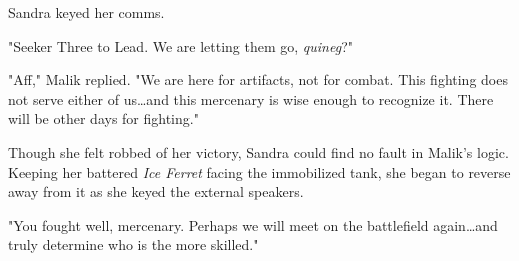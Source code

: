 \begin{multicols}{2}
Sandra keyed her comms. 

"Seeker Three to Lead. We are letting them go, \emph{quineg}?"

"Aff," Malik replied.
"We are here for artifacts, not for combat.
This fighting does not serve either of us{\ldots}and this mercenary is wise enough to recognize it.
There will be other days for fighting."

Though she felt robbed of her victory, Sandra could find no fault in Malik's logic.
Keeping her battered \emph{Ice Ferret} facing the immobilized tank, she began to reverse away from it as she keyed the external speakers. 

"You fought well, mercenary.
Perhaps we will meet on the battlefield again{\ldots}and truly determine who is the more skilled."

\end{multicols}
